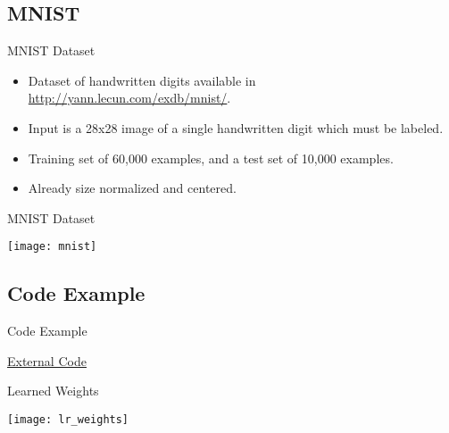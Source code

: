 \subsection{MNIST}
\begin{frame}{MNIST Dataset}
	\begin{itemize}
		\item Dataset of handwritten digits available in \url{http://yann.lecun.com/exdb/mnist/}.
		\item Input is a 28x28 image of a single handwritten digit which must be labeled.
		\item Training set of 60,000 examples, and a test set of 10,000 examples.
		\item Already size normalized and centered.
	\end{itemize}
\end{frame}

\begin{frame}{MNIST Dataset}
	\begin{center}
		\texttt{[image: mnist]}
	\end{center}
\end{frame}

\subsection{Code Example}
\begin{frame}{Code Example}
	\begin{center}
		\textcolor{blue!75}{\underline{ \href{https://github.com/davifrossard/iml/blob/master/04_LogRegAndNN/Sample_Code/Logistic Regression.py}{External Code}}}
	\end{center}
\end{frame}


\begin{frame}{Learned Weights}
	\begin{center}
		\texttt{[image: lr\_weights]}
	\end{center}
\end{frame}


